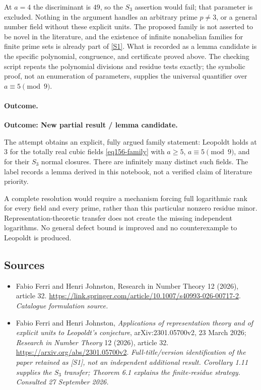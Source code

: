 \documentclass[11pt,a4paper]{article}
\newcommand{\sref}[2]{\hyperlink{source:#1:#2}{[S#2]}}
\numberwithin{equation}{section}
\begin{document}
At $a=4$ the discriminant is $49$, so the $S_3$ assertion would fail;
that parameter is excluded. Nothing in the argument handles an arbitrary
prime $p\ne3$, or a general number field without these explicit units.
The proposed family is not asserted to be novel in the literature, and the
existence of infinite nonabelian families for finite prime sets is already
part of \sref{statement}{1}. What is recorded as a lemma candidate is the
specific polynomial, congruence, and certificate proved above. The checking
script repeats the polynomial divisions and residue tests exactly; the
symbolic proof, not an enumeration of parameters, supplies the universal
quantifier over $a\equiv5\pmod9$.

\paragraph{Outcome.}
\textbf{Outcome: New partial result / lemma candidate.}

The attempt obtains an explicit, fully argued family statement:
Leopoldt holds at $3$ for the totally real cubic fields
\eqref{eq156-family} with $a\ge5$, $a\equiv5\pmod9$, and for their
$S_3$ normal closures. There are infinitely many distinct such fields.
The label records a lemma derived in this notebook, not a verified claim
of literature priority.

A complete resolution would require a mechanism forcing full logarithmic
rank for every field and every prime, rather than this particular nonzero
residue minor. Representation-theoretic transfer does not create the
missing independent logarithms. No general defect bound is improved and no
counterexample to Leopoldt is produced.
\subsection{Sources}
\begin{itemize}\raggedright
\item[\textnormal{[S1]}]\hypertarget{source:statement:1}{} Fabio Ferri and Henri Johnston, Research in Number Theory 12 (2026), article 32.
\url{https://link.springer.com/article/10.1007/s40993-026-00717-2}.
{\small\textit{Catalogue formulation source.}}
\item[\textnormal{[E1]}]\hypertarget{extra:statement:1}{} Fabio Ferri and Henri
Johnston, \emph{Applications of representation theory and of explicit units
to Leopoldt's conjecture}, arXiv:2301.05700v2, 23 March 2026;
\emph{Research in Number Theory} 12 (2026), article 32.
\url{https://arxiv.org/abs/2301.05700v2}.
{\small\textit{Full-title/version identification of the paper retained as
[S1], not an independent additional result. Corollary 1.11 supplies the
$S_3$ transfer; Theorem 6.1 explains the finite-residue strategy.
Consulted 27 September 2026.}}
\end{itemize}
\end{document}

